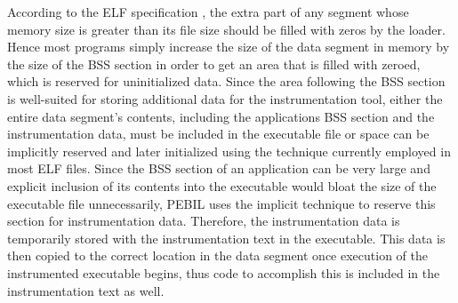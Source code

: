 According to the ELF specification \cite{standard1995executable}, the extra part
of any segment whose memory size is greater than its file size should be filled
with zeros by the loader. Hence most programs simply increase the size of the
data segment in memory by the size of the BSS section in order to get an area
that is filled with zeroed, which is reserved for uninitialized data. Since the
area following the BSS section is well-suited for storing additional data for
the instrumentation tool, either the entire data segment's contents, including
the applications BSS section and the instrumentation data, must be included in
the executable file or space can be implicitly reserved and later initialized
using the technique currently employed in most ELF files. Since the BSS section
of an application can be very large and explicit inclusion of its contents into
the executable would bloat the size of the executable file unnecessarily, PEBIL
uses the implicit technique to reserve this section for instrumentation data.
Therefore, the instrumentation data is temporarily stored with the
instrumentation text in the executable. This data is then copied to the correct
location in the data segment once execution of the instrumented executable
begins, thus code to accomplish this is included in the instrumentation text as
well.
